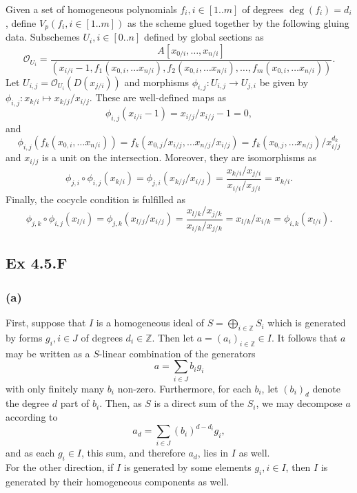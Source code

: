 \documentclass{article}
\theoremstyle{definition}
\newcommand{\Z}{\mathbb{Z}}
\newcommand{\oo}{\mathcal{O}}
\begin{document}
Given a set of homogeneous polynomials $f_i, i \in [1..m]$ of degrees
$\deg(f_i) = d_i$, define $V_p(f_i, i \in [1..m])$ as the scheme glued together
by the following gluing data. Subschemes $U_i, i \in [0..n]$ defined by global
sections as 
\[
	\oo_{U_i}
	=
	\frac{A[x_{0/i}, \ldots, x_{n/i}]}
	{(x_{i/i} - 1, f_{1}(x_{0,i}, \ldots x_{n/i}), f_2(x_{0,i}, \ldots x_{n/i}), \ldots, f_{m}(x_{0,i}, \ldots x_{n/i}))}.
\] 
Let $U_{i,j} = \oo_{U_i}(D(x_{j/i}))$ and morphisms $\phi_{i,j} : U_{i, j} \to
U_{j, i}$ be given by $\phi_{i, j} : x_{k/i} \mapsto x_{k/j}/x_{i/j}$. These 
are well-defined maps as 
\[
	\phi_{i, j}(x_{i/i} - 1)
	=
	x_{i/j}/x_{i/j} - 1
	=
	0,
\] 
and
\[
	\phi_{i,j}(f_{k}(x_{0,i}, \ldots x_{n/i}))
	=
	f_{k}(x_{0,j}/x_{i/j}, \ldots x_{n/j}/x_{i/j})
	=
	f_{k}(x_{0,j}, \ldots x_{n/j})/x_{i/j}^{d_k}
\] 
and $x_{i/j}$ is a unit on the intersection. Moreover, they are isomorphisms 
as 
\[
	\phi_{j, i} \circ \phi_{i, j} (x_{k/i})
	=
	\phi_{j,i}(
	x_{k/j}/x_{i/j}
	)
	=
	\frac{x_{k/i}/x_{j/i}}{x_{i/i}/x_{j/i}}
	=
	x_{k/i}.
\] 
Finally, the cocycle condition is fulfilled as 
\[
	\phi_{j, k} \circ \phi_{i, j} (x_{l/i})
	=
	\phi_{j, k}(x_{l/j}/x_{i/j})
	=
	\frac{x_{l/k}/x_{j/k}}{x_{i/k}/x_{j/k}}
	=
	x_{l/k}/x_{i/k}
	=
	\phi_{i, k}(x_{l/i}).
\] 

\subsection*{Ex 4.5.F}
\subsubsection*{(a)}

First, suppose that $I$ is a homogeneous ideal of $S = \bigoplus_{i \in \Z}
S_i$ which is generated by forms $g_i, i \in J$ of degrees $d_i \in \Z$.
Then let $a = (a_i)_{i \in \Z} \in I$. It follows that $a$ may be written as a
$S$-linear combination of the generators
\[
	a
	=
	\sum_{i \in J} b_i g_i
\] 
with only finitely many $b_i$ non-zero. Furthermore, for each $b_i$, let
$(b_i)_{d}$ denote the degree $d$ part of $b_i$. Then, as $S$ is a direct sum
of the $S_i$, we may decompose $a$ according to
\[
	a_d
	=
	\sum_{i \in J}
	(b_i)^{d - d_i}g_i,
\] 
and as each $g_i \in I$, this sum, and therefore $a_d$, lies in $I$ as well. \\

For the other direction, if $I$ is generated by some elements $g_i, i \in I$,
then $I$ is generated by their homogeneous components as well.
\end{document}
